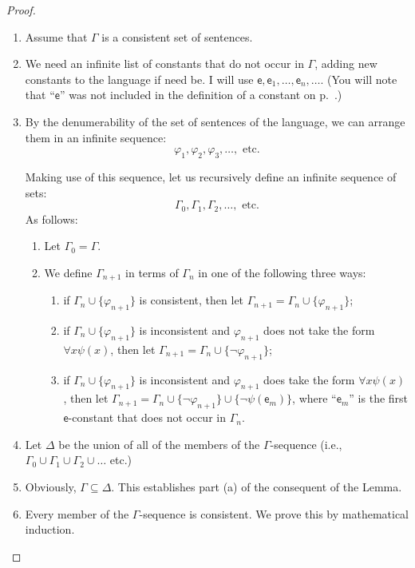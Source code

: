 \documentclass[12pt]{report}
\theoremstyle{nonumberplain}
\newtheorem{proof}{Proof}
\renewcommand{\o}[1]{\mathsf{#1}}
\begin{document}
\begin{proof}
\begin{enumerate}

\item Assume that $Γ$ is a consistent set of sentences.

\item We need an infinite list of constants that do not occur in $Γ$, adding new constants to the language if need be. I will use $\o{e}, \o{e}_1, \dotsc, \o{e}_n, \dots$. (You will note that ``$\o{e}$'' was not included in the definition of a constant on p.~\pageref{constants}.)

\item By the denumerability of the set of sentences of the language, we can arrange them in an infinite sequence:
\[φ_1, φ_2, φ_3, \dotsc, \text{ etc.}\]

\noindent Making use of this sequence, let us recursively define an infinite sequence of sets:
\[Γ_0, Γ_1, Γ_2, \dotsc , \text{ etc.}\]
\noindent As follows:
\begin{enumerate}[label={\alph*)}]
\item Let $Γ_0 = Γ$.
\item We define $Γ_{n+1}$ in terms of $Γ_n$ in one of the
 following three ways:
\begin{enumerate}[label=(\roman*)]
 \item if $Γ_n ∪ \{φ_{n+1}\}$ is consistent, then
let $Γ_{n+1} = Γ_n ∪ \{φ_{n+1}\}$;
 \item if $Γ_n ∪ \{φ_{n+1}\}$ is inconsistent and
$φ_{n+1}$ does not take the form $∀x ψ(x)$,
then let $Γ_{n+1} = Γ_n ∪ \{¬φ_{n+1}\}$;
 \item if $Γ_n ∪ \{φ_{n+1}\}$ is inconsistent and $φ_{n+1}$
 does take the form $∀x ψ(x)$, then
let $Γ_{n+1} = Γ_n ∪ \{¬φ_{n+1}\} ∪ \{¬ψ(\o{e}_m)\}$,
where ``$\o{e}_m$'' is the first $\o{e}$-constant that does not occur in $Γ_n$.
\end{enumerate}\end{enumerate}

\item Let $Δ$ be the union of all of the members of the $Γ$-sequence (i.e., $Γ_0 ∪ Γ_1 ∪ Γ_2 ∪ \ldots$ etc.)

\item Obviously, $Γ ⊆ Δ$. This establishes part (a) of the consequent of the Lemma.

\item Every member of the $Γ$-sequence is consistent. We prove this by mathematical induction.\label{lel:gammaseq}


\end{enumerate}
\end{proof}
\end{document}
